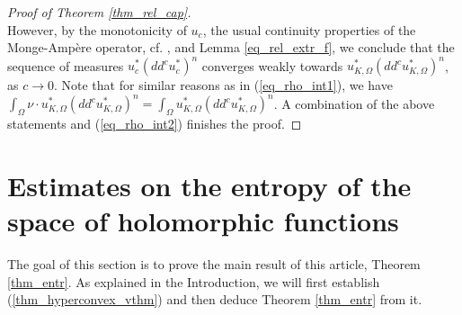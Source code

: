 \documentclass[12pt]{article}
\numberwithin{equation}{section}
\theoremstyle{theorem}
\theoremstyle{definition}
\theoremstyle{remark}
\begin{document}
\begin{proof}[Proof of Theorem \ref{thm_rel_cap}]
\begin{equation}
		\end{equation}
		However, by the monotonicity of $u_c$, the usual continuity properties of the Monge-Ampère operator, cf. \cite[Proposition 5.2]{BedfordTaylor}, and Lemma \ref{eq_rel_extr_f}, we conclude that the sequence of measures $u_c^* (dd^c u_c^*)^{n}$ converges weakly towards $u_{K, \Omega}^* (dd^c u_{K, \Omega}^*)^{n}$, as $c \to 0$.
		Note that for similar reasons as in (\ref{eq_rho_int1}), we have $\int_{\Omega} \nu \cdot u_{K, \Omega}^* (dd^c u_{K, \Omega}^*)^{n} = \int_{\Omega} u_{K, \Omega}^* (dd^c u_{K, \Omega}^*)^{n}$.
		A combination of the above statements and (\ref{eq_rho_int2}) finishes the proof.
	\end{proof}
	
	\section{Estimates on the entropy of the space of holomorphic functions}\label{sect_est_entr}
	The goal of this section is to prove the main result of this article, Theorem \ref{thm_entr}. 
	As explained in the Introduction, we will first establish (\ref{thm_hyperconvex_vthm}) and then deduce Theorem \ref{thm_entr} from it.
\end{document}
